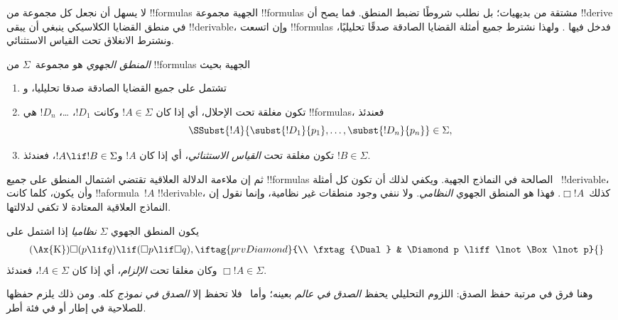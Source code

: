 \documentclass[../../../include/open-logic-section]{subfiles}
\begin{document}


لا يسهل أن نجعل كل مجموعة من !!{formula}s الجهية مجموعة
!!{formula}s مشتقة من بديهيات؛ بل نطلب شروطًا تضبط المنطق.
فما يصح أن !!{derive} في منطق القضايا الكلاسيكي ينبغي أن يبقى
!!{derivable}، وإن اتسعت !!{formula}s فدخل فيها
.
ولهذا نشترط جميع أمثلة القضايا الصادقة صدقًا تحليليًا، ونشترط
الانغلاق تحت القياس الاستثنائي.

\begin{defn}
  \emph{المنطق الجهوي} هو مجموعة~$\Sigma$ من !!{formula}s الجهية بحيث
  \begin{enumerate}
  \item تشتمل على جميع القضايا الصادقة صدقا تحليليا، و
  \item تكون مغلقة تحت الإحلال، أي إذا كان $!A \in \Sigma$ وكانت
    $!D_1$، \dots، $!D_n$ هي !!{formula}s، فعندئذ
    \[
    \SSubst{!A}{\subst{!D_1}{p_1}, \dots, \subst{!D_n}{p_n}} \in \Sigma,
    \]
  \item تكون مغلقة تحت \emph{القياس الاستثنائي}، أي إذا كان $!A$
    و$!A \lif !B \in \Sigma$، فعندئذ $!B \in \Sigma$.
  \end{enumerate}
\end{defn}

ثم إن ملاءمة الدلالة العلاقية تقتضي اشتمال المنطق على جميع
!!{formula}s الصالحة في النماذج الجهية. ويكفي لذلك أن تكون
كل أمثلة~  !!{derivable}،
وأن يكون، كلما كانت !!a{formula}~$!A$ !!{derivable}،
كذلك~$\Box !A$. فهذا هو المنطق الجهوي \emph{النظامي}.
ولا ننفي وجود منطقات غير نظامية، وإنما نقول إن النماذج العلاقية
المعتادة لا تكفي لدلالتها.

\begin{defn}
  يكون المنطق الجهوي $\Sigma$ \emph{نظاميا} إذا اشتمل على
  \begin{align*}
    \tag{\Ax{K}} & \Box(p \lif q) \lif (\Box p \lif \Box q),
    \iftag{prvDiamond}{\\
      \tag{\Dual} & \Diamond p \liff \lnot\Box\lnot p}{}
  \end{align*}
  وكان مغلقا تحت \emph{الإلزام}، أي إذا كان $!A \in
  \Sigma$، فعندئذ $\Box !A \in \Sigma$.
\end{defn}

وهنا فرق في مرتبة حفظ الصدق: اللزوم التحليلي يحفظ
\emph{الصدق في عالم} بعينه؛ وأما~\Nec{} فلا تحفظ إلا
\emph{الصدق في نموذج} كله. ومن ذلك يلزم حفظها للصلاحية
في إطار أو في فئة أطر.
\end{document}
